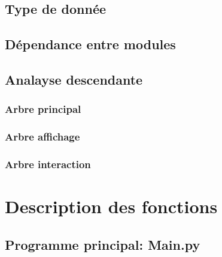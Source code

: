 \documentclass[a4paper]{article}
\begin{document}
        \subsection{Type de donnée}
            \begin{alltt}
            
            \end{alltt}
        \subsection{Dépendance entre modules}
        \subsection{Analayse descendante}
            \subsubsection{Arbre principal}
            \begin{alltt}
            
            \end{alltt}
            \subsubsection{Arbre affichage}
            \begin{alltt}
            
            \end{alltt}
            \subsubsection{Arbre interaction}
            \begin{alltt}
            
            \end{alltt}
    \section{Description des fonctions}
        \subsection{Programme principal: Main.py}
            \begin{alltt}
            
               
            \end{alltt}
\end{document}
